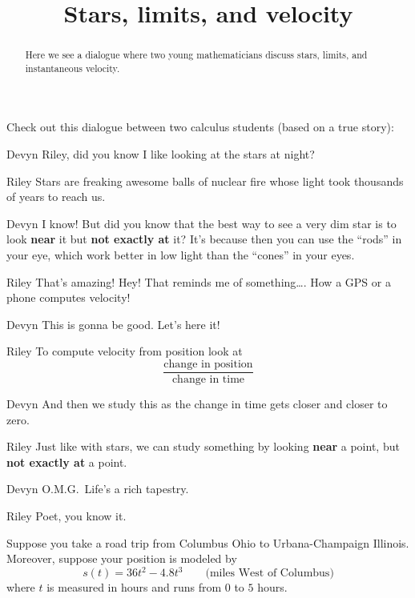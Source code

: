 \documentclass{ximera}
\title[Break-Ground:]{Stars, limits, and velocity}
\begin{document}
\begin{abstract}
Here we see a dialogue where two young mathematicians discuss stars,
limits, and instantaneous velocity.
\end{abstract}
\maketitle

Check out this dialogue between two calculus students (based on a true
story):

\begin{dialogue}
\item[Devyn] Riley, did you know I like looking at the stars at night?
\item[Riley] Stars are freaking awesome balls of nuclear fire whose
  light took thousands of years to reach us.
\item[Devyn] I know! But did you know that the best way to see a very
  dim star is to look \textbf{near} it but \textbf{not exactly at} it? It's
  because then you can use the ``rods'' in your eye, which work better
  in low light than the ``cones'' in your eyes.
\item[Riley] That's amazing! Hey! That reminds me of something\dots.
  How a GPS or a phone computes velocity!
\item[Devyn] This is gonna be good. Let's here it!
\item[Riley] To compute velocity from position look at
  \[
  \frac{\text{change in position}}{\text{change in time}}
  \]
\item[Devyn] And then we study this as the change in time gets closer
  and closer to zero.
\item[Riley] Just like with stars, we can study something by looking
  \textbf{near} a point, but \textbf{not exactly at} a point.
\item[Devyn] O.M.G.\ Life's a rich tapestry.
\item[Riley] Poet, you know it.
\end{dialogue}


\begin{problem}
  Suppose you take a road trip from Columbus Ohio to Urbana-Champaign
  Illinois. Moreover, suppose your position is modeled by
  \[
  s(t) = 36t^2 -4.8t^3 \qquad\text{(miles West of Columbus)} %
  \]
  where $t$ is measured in hours and runs from $0$ to $5$ hours. 
\end{problem}
\end{document}
